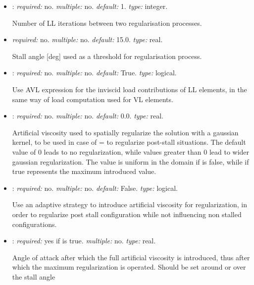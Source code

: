 \begin{itemize}
\item {}: \textit{required:} no. \textit{multiple:} no. \textit{default:} 1. \textit{type:} integer.

Number of LL iterations between two regularisation processes.

\item {} \textit{required:} no. \textit{multiple:} no. \textit{default:} 15.0. \textit{type:} real.

Stall angle [deg] used as a threshold for regularisation process. 

\item {}: \textit{required:} no. \textit{multiple:} no. \textit{default:} True. \textit{type:} logical.

Use AVL expression for the inviscid load contributions of LL elements, in the same way of load computation used for VL elements.

\item {}: \textit{required:} no. \textit{multiple:} no. \textit{default:} 0.0. \textit{type:} real.

Artificial viscosity used to spatially regularize the solution with a gaussian kernel, to be used in case of  =  to regularize post-stall situations. The default value of 0 leads to no regularization, while values greater than 0 lead to wider gaussian regularization. The value is uniform in the domain if  is false, while if true represents the maximum introduced value.

\item {}: \textit{required:} no. \textit{multiple:} no. \textit{default:} False. \textit{type:} logical.

Use an adaptive strategy to introduce artificial viscosity for regularization, in order to regularize post stall configuration while not influencing non stalled configurations. 

\item {}: \textit{required:} yes if  is true. \textit{multiple:} no. \textit{type:} real.

Angle of attack after which the full artificial viscosity is introduced, thus after which the maximum regularization is operated. Should be set around or over the stall angle


\end{itemize}
